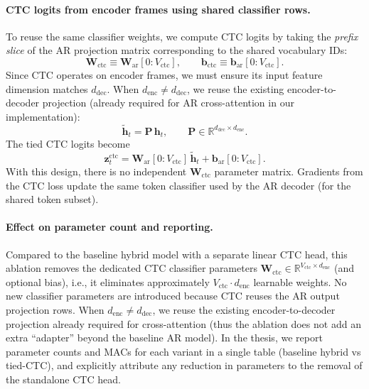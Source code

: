 \paragraph{CTC logits from encoder frames using shared classifier rows.}
To reuse the same classifier weights, we compute CTC logits by taking the \emph{prefix slice} of the AR projection matrix corresponding to the shared vocabulary IDs:
\begin{equation}
\mathbf{W}_{\text{ctc}} \equiv \mathbf{W}_{\text{ar}}[0{:}V_{\text{ctc}}],
\qquad \mathbf{b}_{\text{ctc}} \equiv \mathbf{b}_{\text{ar}}[0{:}V_{\text{ctc}}].
\end{equation}
Since CTC operates on encoder frames, we must ensure its input feature dimension matches $d_{\text{dec}}$.
When $d_{\text{enc}} \ne d_{\text{dec}}$, we reuse the existing encoder-to-decoder projection (already required for AR cross-attention in our implementation):
\begin{equation}
\tilde{\mathbf{h}}_t = \mathbf{P}\, \mathbf{h}_t, \qquad \mathbf{P} \in \mathbb{R}^{d_{\text{dec}} \times d_{\text{enc}}}.
\end{equation}
The tied CTC logits become
\begin{equation}
\mathbf{z}^{\text{ctc}}_t = \mathbf{W}_{\text{ar}}[0{:}V_{\text{ctc}}] \, \tilde{\mathbf{h}}_t + \mathbf{b}_{\text{ar}}[0{:}V_{\text{ctc}}].
\label{eq:tied-ctc-logits}
\end{equation}
With this design, there is no independent $\mathbf{W}_{\text{ctc}}$ parameter matrix.
Gradients from the CTC loss update the same token classifier used by the AR decoder (for the shared token subset).

\paragraph{Effect on parameter count and reporting.}
Compared to the baseline hybrid model with a separate linear CTC head, this ablation removes the dedicated CTC classifier parameters $\mathbf{W}_{\text{ctc}} \in \mathbb{R}^{V_{\text{ctc}}\times d_{\text{enc}}}$ (and optional bias), i.e., it eliminates approximately $V_{\text{ctc}}\cdot d_{\text{enc}}$ learnable weights.
No new classifier parameters are introduced because CTC reuses the AR output projection rows.
When $d_{\text{enc}}\ne d_{\text{dec}}$, we reuse the existing encoder-to-decoder projection already required for cross-attention (thus the ablation does not add an extra ``adapter'' beyond the baseline AR model).
In the thesis, we report parameter counts and MACs for each variant in a single table (baseline hybrid vs tied-CTC), and explicitly attribute any reduction in parameters to the removal of the standalone CTC head.

